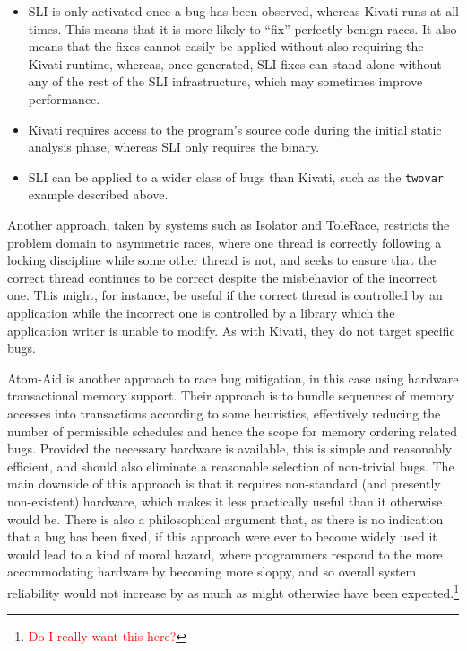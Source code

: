 \documentclass[10pt,twocolumn,preprint,natbib,authoryear]{sigplanconf}
\newcommand{\editorial}[1]{\textcolor{red}{\footnote{\textcolor{red}{#1}}}}
\begin{document}
\begin{itemize}
\item SLI is only activated once a bug has been observed, whereas
  Kivati runs at all times.  This means that it is more likely to
  ``fix'' perfectly benign races.  It also means that the fixes cannot
  easily be applied without also requiring the Kivati runtime,
  whereas, once generated, SLI fixes can stand alone without any of
  the rest of the SLI infrastructure, which may sometimes improve
  performance.

\item Kivati requires access to the program's source code during the
  initial static analysis phase, whereas SLI only requires the binary.

\item SLI can be applied to a wider class of bugs than Kivati, such as
  the \verb|twovar| example described above.
\end{itemize}

Another approach, taken by systems such as
Isolator\cite{Ramalingam2009} and ToleRace\cite{Kirovski2007},
restricts the problem domain to asymmetric races, where one thread is
correctly following a locking discipline while some other thread is
not, and seeks to ensure that the correct thread continues to be
correct despite the misbehavior of the incorrect one.  This might,
for instance, be useful if the correct thread is controlled by an
application while the incorrect one is controlled by a library which
the application writer is unable to modify.  As with Kivati, they do
not target specific bugs.

Atom-Aid\cite{Lucia2009} is another approach to race bug
mitigation, in this case using hardware transactional memory support.
Their approach is to bundle sequences of memory accesses into
transactions according to some heuristics, effectively reducing the
number of permissible schedules and hence the scope for memory
ordering related bugs.  Provided the necessary hardware is available,
this is simple and reasonably efficient, and should also eliminate a
reasonable selection of non-trivial bugs.  The main downside of this
approach is that it requires non-standard (and presently non-existent)
hardware, which makes it less practically useful than it otherwise
would be.  There is also a philosophical argument that, as there is no
indication that a bug has been fixed, if this approach were ever to
become widely used it would lead to a kind of moral hazard, where
programmers respond to the more accommodating hardware by becoming
more sloppy, and so overall system reliability would not increase by
as much as might otherwise have been expected.\editorial{Do I really
  want this here?}
\end{document}

